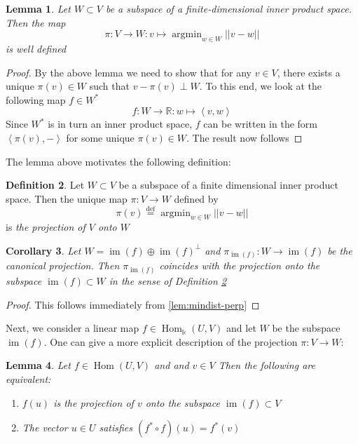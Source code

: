 \documentclass{book}
\theoremstyle{plain}
\newtheorem{corollary}{Corollary}[section]
\newtheorem{lemma}[corollary]{Lemma}
\theoremstyle{definition}
\newtheorem{definition}[corollary]{Definition}
\DeclareMathOperator{\argmin}{argmin}
\newcommand{\bl}[2]{\left\langle #1,#2\right\rangle}
\renewcommand{\d}[1]{\mathbb{#1}}
\newcommand{\define}{\stackrel{\operatorname{def}}{=}}
\newcommand{\ds}{\oplus}
\newcommand{\fun}{\mapsto}
\newcommand{\norm}[1]{\vert \vert #1 \vert \vert}
\DeclareMathOperator{\Hom}{Hom}
\DeclareMathOperator{\im}{im}
\renewcommand{\k}{\Bbbk}
\newcommand{\mor}{\longrightarrow}
\begin{document}
\begin{lemma}\label{lem:projection}
	Let $W \subset V$ be a  subspace of a finite-dimensional inner product space. Then the map
	\[
	\pi: V\mor W: v \fun \argmin_{w \in W} \norm{v- w}
	\]
	is well defined
\end{lemma}

\begin{proof}
	By the above lemma we need to show that for any $v \in V$, there exists a unique $\pi(v) \in W$ such that $v-\pi(v) \perp W$. To this end, we look at the following map $ f \in W^*$
	\[
	f: W \mor \d{R}: w \fun \bl{v}{w}
	\]
	Since $W^*$ is in turn an inner product space, $f$ can be written in the form $\bl{\pi(v)}{-}$ for some unique $\pi(v) \in W$. The result now follows
\end{proof}

The lemma above motivates the following definition:

\begin{definition}\label{def:projection}
	Let $W\subset V$ be a subspace of a finite dimensional inner product space. Then the unique map $\pi: V\mor W$ defined by 
	\[
	\pi(v) \define \argmin_{w \in W}\norm{v-w}
	\]
	is \emph{the projection of $V$ onto $W$}
\end{definition}
\begin{corollary}\label{lem:projcoincide}
	Let $W=\im(f)\ds \im(f)^{\perp}$ and $\pi_{\im(f)}:W\mor \im(f)$ be the canonical projection. Then $\pi_{\im(f)}$ coincides with the projection onto the subspace $\im(f)\subset W$ in the sense of Definition \ref{def:projection}
\end{corollary}

\begin{proof}
This follows immediately from \ref{lem:mindist-perp}
\end{proof}
\noindent Next, we consider a linear map $f \in \Hom_\k(U,V)$ and let $W$ be the subspace $\im(f)$. One can give a more explicit description of the projection $\pi: V\mor W$:

\begin{lemma}\label{lem:normaleq}
	Let $f \in \Hom(U,V)$ and and $v \in V$ Then the following are equivalent:
	\begin{enumerate}
		\item	$f(u)$ is the projection of $v$ onto the subspace $\im(f)\subset V$
		\item The vector $u \in U$ satisfies $(f^* \circ f)(u) = f^*(v)$	
	\end{enumerate}
\end{lemma}
\end{document}
